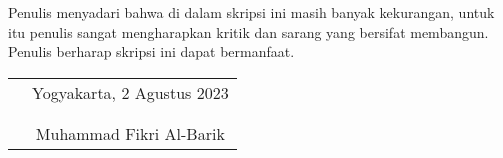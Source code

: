 \documentclass{skripsimathugm}
\begin{document}
Penulis menyadari bahwa di dalam skripsi ini masih banyak kekurangan, untuk itu penulis sangat mengharapkan kritik dan sarang yang bersifat membangun. Penulis berharap skripsi ini dapat bermanfaat.
\vspace{0.8cm}

\begin{tabular}{p{7cm}c}
&Yogyakarta, 2 Agustus 2023\\
&\\
&\\
&Muhammad Fikri Al-Barik
\end{tabular}


\newpage{}
\makeatletter\renewcommand{}\makeatother
\begin{singlespacing}\tableofcontents\end{singlespacing}

\newpage{}
\begin{singlespacing}\listoftables\end{singlespacing}

\newpage{}
\begin{singlespacing}\listoffigures\end{singlespacing}
\end{document}
